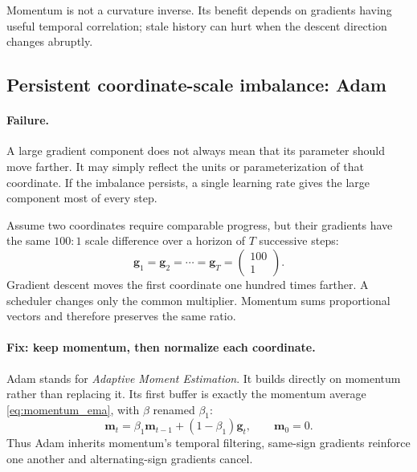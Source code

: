 \documentclass[11pt,letterpaper]{article}
\begin{document}
Momentum is not a curvature inverse. Its benefit depends on gradients having
useful temporal correlation; stale history can hurt when the descent direction
changes abruptly.

\subsection{Persistent coordinate-scale imbalance: Adam}

\paragraph{Failure.}
A large gradient component does not always mean that its parameter should move
farther. It may simply reflect the units or parameterization of that
coordinate. If the imbalance persists, a single learning rate gives the large
component most of every step.

Assume two coordinates require comparable progress, but their gradients have
the same \(100{:}1\) scale difference over a horizon of \(T\) successive
steps:
\begin{equation}\label{eq:adam_scale_example}
  \bm g_1=\bm g_2=\cdots=\bm g_T
  =\begin{pmatrix}100\\1\end{pmatrix}.
\end{equation}
Gradient descent moves the first coordinate one hundred times farther. A
scheduler changes only the common multiplier. Momentum sums proportional
vectors and therefore preserves the same ratio.

\paragraph{Fix: keep momentum, then normalize each coordinate.}
Adam stands for \emph{Adaptive Moment Estimation}. It builds directly on
momentum rather than replacing it. Its first buffer is exactly the momentum
average \eqref{eq:momentum_ema}, with \(\beta\) renamed \(\beta_1\):
\begin{equation}
  \bm m_t
  =\beta_1\bm m_{t-1}+(1-\beta_1)\bm g_t,
  \qquad \bm m_0=0.
\end{equation}
Thus Adam inherits momentum's temporal filtering, same-sign gradients
reinforce one another and alternating-sign gradients cancel.
\end{document}
